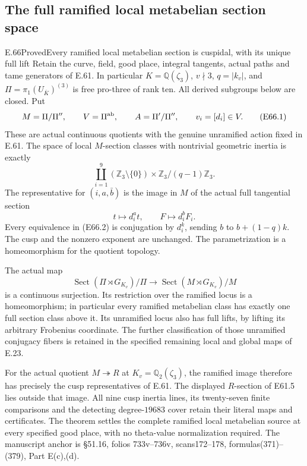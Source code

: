 \subsection{The full ramified local metabelian section space}

\begin{statement}{E.66}{Proved}{Every ramified local metabelian section is cuspidal, with its unique full lift}
Retain the curve, field, good place, integral tangents, actual paths
and tame generators of E.61. In particular
$K=\mathbb Q(\zeta_3)$, $v\nmid3$, $q=|k_v|$, and
$\Pi=\pi_1(U_{\overline K})^{(3)}$ is free pro-three of rank ten.
All derived subgroups below are closed. Put
\[
 M=\Pi/\Pi'',\qquad V=\Pi^{\rm ab},\qquad
 A=\Pi'/\Pi'',\qquad v_i=[d_i]\in V.
 \tag{E66.1}
\]
These are actual continuous quotients with the genuine unramified
action fixed in E.61. The space of local $M$-section classes with
nontrivial geometric inertia is exactly
\[
 \coprod_{i=1}^{9}
   (\mathbb Z_3\setminus\{0\})\times
                \mathbb Z_3/(q-1)\mathbb Z_3.
 \tag{E66.2}
\]
The representative for $(i,a,\bar b)$ is the image in $M$ of
the actual full tangential section
\[
            t\longmapsto d_i^a t,\qquad
            F\longmapsto d_i^bF_i.
 \tag{E66.3}
\]
Every equivalence in (E66.2) is conjugation by $d_i^k$, sending
$b$ to $b+(1-q)k$. The cusp and the nonzero exponent are unchanged.
The parametrization is a homeomorphism for the quotient topology.

The actual map
\[
 \operatorname{Sect}(\Pi\rtimes G_{K_v})/\Pi
       \longrightarrow
 \operatorname{Sect}(M\rtimes G_{K_v})/M
 \tag{E66.4}
\]
is a continuous surjection. Its restriction over the ramified locus
is a homeomorphism; in particular every ramified metabelian class
has exactly one full section class above it. Its unramified locus
also has full lifts, by lifting its arbitrary Frobenius coordinate.
The further classification of those unramified conjugacy fibers is
retained in the specified remaining local and global maps of E.23.

For the actual quotient $M\twoheadrightarrow R$ at
$K_v=\mathbb Q_2(\zeta_3)$, the ramified image therefore has
precisely the cusp representatives of E.61. The displayed
$R$-section of E61.5 lies outside that image. All nine cusp
inertia lines, its twenty-seven finite comparisons and the
detecting degree-$19683$ cover retain their literal maps and
certificates. The theorem settles the complete ramified local
metabelian source at every specified good place, with no
theta-value normalization required.
The manuscript anchor is \S51.16, folios 733v--736v,
scans172--178, formulas(371)--(379), Part E(c),(d).
\end{statement}

